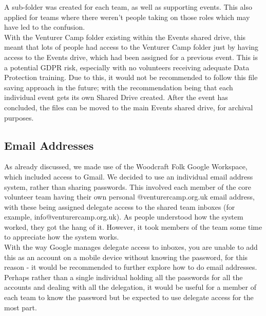 A sub-folder was created for each team, as well as supporting events. This also applied for teams where there weren't people taking on those roles which may have led to the confusion. \\

With the Venturer Camp folder existing within the Events shared drive, this meant that lots of people had access to the Venturer Camp folder just by having access to the Events drive, which had been assigned for a previous event. This is a potential GDPR risk, especially with no volunteers receiving adequate Data Protection training. Due to this, it would not be recommended to follow this file saving approach in the future; with the recommendation being that each individual event gets its own Shared Drive created. After the event has concluded, the files can be moved to the main Events shared drive, for archival purposes. 

\subsection{Email Addresses}
As already discussed, we made use of the Woodcraft Folk Google Workspace, which included access to Gmail. We decided to use an individual email address system, rather than sharing passwords. This involved each member of the core volunteer team having their own personal @venturercamp.org.uk email address, with these being assigned delegate access to the shared team inboxes (for example, info@venturercamp.org.uk). As people understood how the system worked, they got the hang of it. However, it took members of the team some time to appreciate how the system works.\\

With the way Google manages delegate access to inboxes, you are unable to add this as an account on a mobile device without knowing the password, for this reason - it would be recommended to further explore how to do email addresses. Perhaps rather than a single individual holding all the passwords for all the accounts and dealing with all the delegation, it would be useful for a member of each team to know the password but be expected to use delegate access for the most part. 
